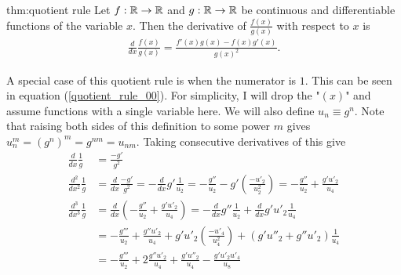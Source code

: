 \begin{theo}{thm:quotient rule}
	Let $f:{\mathbb R} \to {\mathbb R}$ and $g: {\mathbb R}\to{\mathbb R}$ be continuous and differentiable functions of the variable $x$. Then the derivative of $\frac{f(x)}{g(x)}$ with respect to $x$ is
	\begin{align}
		\frac{d}{dx} \frac{f(x)}{g(x)} = \frac{f'(x)g(x)-f(x)g'(x)}{g(x)^2}.
	\end{align}
\end{theo}
A special case of this quotient rule is when the numerator is $1$. This can be seen in equation (\ref{quotient_rule_00}). For simplicity, I will drop the "$(x)$" and assume functions with a single variable here. We will also define $u_n \equiv g^n$. Note that raising both sides of this definition to some power $m$ gives $u_n^m = (g^n)^m = g^{nm} = u_{nm}$. Taking consecutive derivatives of this give
\begin{align}
	\frac{d}{dx}\frac{1}{g} &= \frac{-g'}{g^2} \\
	\frac{d^2}{dx^2}\frac{1}{g} &= \frac{d}{dx}\frac{-g'}{g^2} = -\frac{d}{dx}g'\frac{1}{u_2} = -\frac{g''}{u_2}-g'\left(\frac{-u'_2}{u_2^2}\right) = -\frac{g''}{u_2}+\frac{g'u'_2}{u_4} \\
	\frac{d^3}{dx^3}\frac{1}{g} &= \frac{d}{dx}\left(-\frac{g''}{u_2}+\frac{g'u'_2}{u_4}\right) = - \frac{d}{dx}g''\frac{1}{u_2} + \frac{d}{dx}g'u'_2\frac{1}{u_4} \\
	&= -\frac{g'''}{u_2}+\frac{g''u'_2}{u_4}+ g'u'_2\left(\frac{-u'_4}{u^2_4}\right)+ (g'u''_2+g''u'_2)\frac{1}{u_4} \\
	&= -\frac{g'''}{u_2}+2\frac{g''u'_2}{u_4}+ \frac{g'u''_2}{u_4}-\frac{g'u'_2u'_4}{u_8}
\end{align}

















































